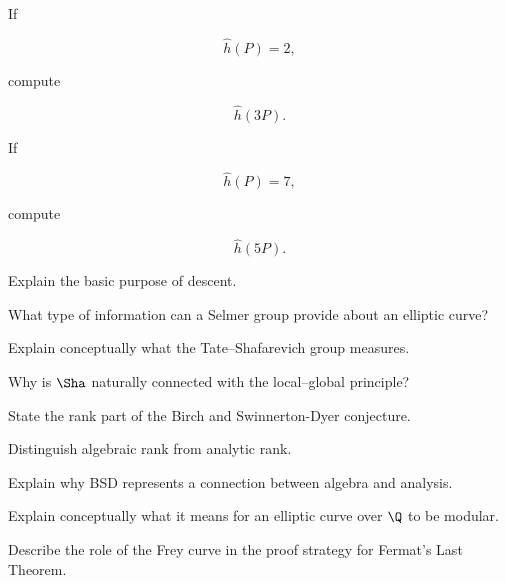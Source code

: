 \begin{exercise}[1]
If

\[ \hat h(P)=2, \]

compute

\[ \hat h(3P). \]
\end{exercise}

\begin{exercise}[1]
If

\[ \hat h(P)=7, \]

compute

\[ \hat h(5P). \]
\end{exercise}

\begin{exercise}[2]
Explain the basic purpose of descent.
\end{exercise}

\begin{exercise}[2]
What type of information can a Selmer group provide about an elliptic curve?
\end{exercise}

\begin{exercise}[2]
Explain conceptually what the Tate--Shafarevich group measures.
\end{exercise}

\begin{exercise}[2]
Why is \(\Sha\) naturally connected with the local--global principle?
\end{exercise}

\begin{exercise}[2]
State the rank part of the Birch and Swinnerton-Dyer conjecture.
\end{exercise}

\begin{exercise}[2]
Distinguish algebraic rank from analytic rank.
\end{exercise}

\begin{exercise}[2]
Explain why BSD represents a connection between algebra and analysis.
\end{exercise}

\begin{exercise}[2]
Explain conceptually what it means for an elliptic curve over \(\Q\) to be
modular.
\end{exercise}

\begin{exercise}[2]
Describe the role of the Frey curve in the proof strategy for Fermat's Last
Theorem.
\end{exercise}

